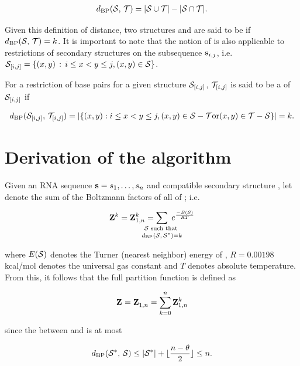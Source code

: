 \begin{align}
\label{eq:fftbor:dBP}
\dBP{\str}{\strT} = |\str \cup \strT| - |\str \cap \strT|.
\end{align}

Given this definition of distance, two structures \str and \strT are said to
be \kNbrs if $d_{\text{BP}}(\mathcal S,\,\mathcal T) = k$. It is important to note that
the notion of \bpd is also applicable to restrictions of secondary structures
on the subsequence ${\bf s}_{i,j}$,
i.e. $\mathcal S_{[i,j]} = \{ (x,y) \,:\, i \leq  x < y \leq j,  (x,y) \in \mathcal S \}$.

For a restriction of base pairs for a given structure $\mathcal S_{[i,j]}$,
$\mathcal T_{[i,j]}$ is said to be a \kNbr of $\mathcal S_{[i,j]}$ if

\begin{align}
\label{eq:fftbor:dBPonRestriction}
\dBP{\str_{[i,j]}}{\strT_{[i,j]}} =
|\{ (x,y): i \leq x<y\leq j,
(x,y) \in \str - \strT \text{or} (x,y) \in \strT - \str \}| = k.
\end{align}

\section{Derivation of the \fftbor algorithm}
\label{sec:fftbor:math}

Given an RNA sequence ${\bf s}=s_1,\dots,s_n$ and compatible secondary structure
\strSt, let  denote the sum of the Boltzmann factors
\boltzf{\str} of all \kNbrs \str of \strSt; i.e.

\begin{align}
\bfZ{k}{} = \bfZ{k}{1,n} =
\sum_{\mathclap{\substack{\str \text{ such that } \rule[-.5ex]{0pt}{0pt} \\
 \dBP{\str}{\strSt}=k}}}\;
\boltzF{\str}
\end{align}

where $E(\mathcal S)$ denotes the Turner (nearest neighbor)
energy \citep{xia:RNA}
of \str, $R = 0.00198$ kcal/mol denotes the universal
gas constant and $T$ denotes absolute temperature. From this, it follows that
the full partition function is defined as

\begin{align}
\label{eq:fftbor:partFunc}
\fullZ = \bfZ{}{1,n} = \sum_{k=0}^n \bfZ{k}{1,n}
\end{align}

since the \bpd between \strSt and \str is at most

\begin{align}
\label{eq:fftbor:maxDist}
\dBP{\strSt}{\str} \leq |\strSt| + \lfloor \frac{n-\theta}{2} \rfloor \leq n.
\end{align}


